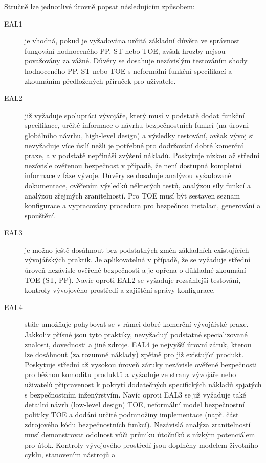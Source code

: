 \documentclass[a4paper,12pt]{article}
\begin{document}
Stručně lze jednotlivé úrovně popsat následujícím způsobem:
\begin{description}
\item[EAL1] je vhodná, pokud je vyžadována určitá základní důvěra ve správnost fungování
hodnoceného PP, ST nebo TOE, avšak hrozby nejsou považovány za vážné. Důvěry se dosahuje
nezávislým testováním shody hodnoceného PP, ST nebo TOE s neformální funkční specifikací a
zkoumáním předložených příruček pro uživatele.
\item[EAL2] již vyžaduje spolupráci vývojáře, který musí v podstatě dodat funkční specifikace,
určité informace o návrhu bezpečnostních funkcí (na úrovni globálního návrhu, high-level design) a
výsledky testování, avšak vývoj si nevyžaduje více úsilí nežli je potřebné pro dodržování dobré
komerční praxe, a v podstatě nepřináší zvýšení nákladů. Poskytuje nízkou až střední nezávisle
ověřenou bezpečnost v případě, že není dostupná kompletní informace z fáze vývoje. Důvěry se
dosahuje analýzou vyžadované dokumentace, ověřením výsledků některých testů, analýzou síly
funkcí a analýzou zřejmých zranitelností. Pro TOE musí být sestaven seznam konfigurace a
vypracovány procedura pro bezpečnou instalaci, generování a spouštění.
\item[EAL3] je možno ještě dosáhnout bez podstatných změn základních existujících vývojářských
praktik. Je aplikovatelná v případě, že se vyžaduje střední úroveň nezávisle ověřené bezpečnosti a je
opřena o důkladné zkoumání TOE (ST, PP). Navíc oproti EAL2 se vyžaduje rozsáhlejší testování,
kontroly vývojového prostředí a zajištění správy konfigurace.
\item[EAL4] stále umožňuje pohybovat se v rámci dobré komerční vývojářské praxe. Jakkoliv přísné
jsou tyto praktiky, nevyžadují podstatné specializované znalosti, dovednosti a jiné zdroje. EAL4 je
nejvyšší úrovní záruk, kterou lze dosáhnout (za rozumné náklady) zpětně pro již existující produkt.
Poskytuje střední až vysokou úroveň záruky nezávisle ověřené bezpečnosti pro běžnou komoditu
produktů a vyžaduje ze strany vývojáře nebo uživatelů připravenost k pokrytí dodatečných
specifických nákladů spjatých s bezpečnostním inženýrstvím. Navíc oproti EAL3 se již vyžaduje také
detailní návrh (low-level design) TOE, neformální model bezpečnostní politiky TOE a dodání určité
podmnožiny implementace (např. část zdrojového kódu bezpečnostních funkcí). Nezávislá analýza
zranitelností musí demonstrovat odolnost vůči průniku útočníků s nízkým potenciálem pro útok.
Kontroly vývojového prostředí jsou doplněny modelem životního cyklu, stanovením nástrojů a

\end{description}
\end{document}
